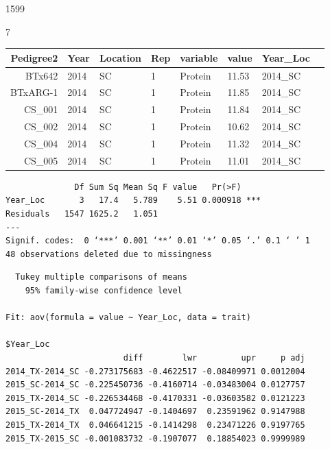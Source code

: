 \documentclass[11pt]{article}
\begin{document}
    \begin{enumerate*}
\item 1599
\item 7
\end{enumerate*}


    
    \begin{tabular}{r|lllllll}
 Pedigree2 & Year & Location & Rep & variable & value & Year\_Loc\\
\hline
	 BTx642    & 2014      & SC        & 1         & Protein   & 11.53     & 2014\_SC\\
	 BTxARG-1  & 2014      & SC        & 1         & Protein   & 11.85     & 2014\_SC\\
	 CS\_001   & 2014       & SC         & 1          & Protein    & 11.84      & 2014\_SC \\
	 CS\_002   & 2014       & SC         & 1          & Protein    & 10.62      & 2014\_SC \\
	 CS\_004   & 2014       & SC         & 1          & Protein    & 11.32      & 2014\_SC \\
	 CS\_005   & 2014       & SC         & 1          & Protein    & 11.01      & 2014\_SC \\
\end{tabular}


    
    
    \begin{verbatim}
              Df Sum Sq Mean Sq F value   Pr(>F)    
Year_Loc       3   17.4   5.789    5.51 0.000918 ***
Residuals   1547 1625.2   1.051                     
---
Signif. codes:  0 ‘***’ 0.001 ‘**’ 0.01 ‘*’ 0.05 ‘.’ 0.1 ‘ ’ 1
48 observations deleted due to missingness
    \end{verbatim}

    
    
    \begin{verbatim}
  Tukey multiple comparisons of means
    95% family-wise confidence level

Fit: aov(formula = value ~ Year_Loc, data = trait)

$Year_Loc
                        diff        lwr         upr     p adj
2014_TX-2014_SC -0.273175683 -0.4622517 -0.08409971 0.0012004
2015_SC-2014_SC -0.225450736 -0.4160714 -0.03483004 0.0127757
2015_TX-2014_SC -0.226534468 -0.4170331 -0.03603582 0.0121223
2015_SC-2014_TX  0.047724947 -0.1404697  0.23591962 0.9147988
2015_TX-2014_TX  0.046641215 -0.1414298  0.23471226 0.9197765
2015_TX-2015_SC -0.001083732 -0.1907077  0.18854023 0.9999989

    \end{verbatim}
\end{document}
